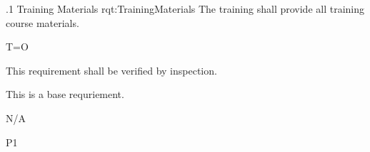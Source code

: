 \ONERQMTV
{\RqtNumberBase.1}
{Training Materials}
{rqt:TrainingMaterials}
{The \ThisSys training shall provide all training course materials.}
{
	\item [Phase 1] T=O
}
{This requirement shall be verified by inspection.}
{
\item [N/A] This is a base requriement.
}
{
	\item N/A
}
{P1}

